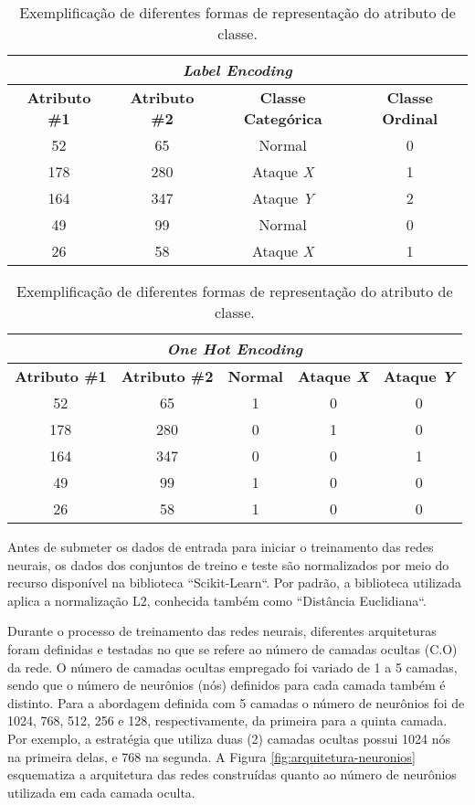 \begin{table}[H]
    \centering
    \begin{tabular}{cccc}
        \multicolumn{4}{c}{\textit{Label Encoding}} \\
        \hline
        \textbf{Atributo \#1} & \textbf{Atributo \#2} & \textbf{Classe Categórica} & \textbf{Classe Ordinal} \\
        \hline
        52 & 65 & Normal & 0 \\
        178 & 280 & Ataque \textit{X} & 1 \\
        164 & 347 & Ataque \textit{Y} & 2 \\
        49 & 99 & Normal & 0 \\
        26 & 58 & Ataque \textit{X} & 1 \\
        \hline
    \end{tabular}
    \begin{tabular}{ccccc}
        \\
        \multicolumn{5}{c}{\textit{One Hot Encoding}} \\
        \hline
        \textbf{Atributo \#1} & \textbf{Atributo \#2} & \textbf{Normal} & \textbf{Ataque \textit{X}} & \textbf{Ataque \textit{Y}} \\
        \hline
        52 & 65 & 1 & 0 & 0\\
        178 & 280 & 0 & 1 & 0 \\
        164 & 347 & 0 & 0 & 1 \\
        49 & 99 & 1 & 0 & 0\\
        26 & 58 & 1 & 0 & 0\\
        \hline
    \end{tabular}
    \caption{Exemplificação de diferentes formas de representação do atributo de classe.}
    \label{tab:encoding}
\end{table}


Antes de submeter os dados de entrada para iniciar o treinamento das redes neurais, os dados dos conjuntos de treino e teste são normalizados por meio do recurso disponível na biblioteca ``Scikit-Learn``. Por padrão, a biblioteca utilizada aplica a normalização L2, conhecida também como ``Distância Euclidiana``.

Durante o processo de treinamento das redes neurais, diferentes arquiteturas foram definidas e testadas no que se refere ao número de camadas ocultas (C.O) da rede. O número de camadas ocultas empregado foi variado de 1 a 5 camadas, sendo que o número de neurônios (nós) definidos para cada camada também é distinto. Para a abordagem definida com 5 camadas o número de neurônios foi de 1024, 768, 512, 256 e 128, respectivamente, da primeira para a quinta camada. Por exemplo, a estratégia que utiliza duas (2) camadas ocultas possui 1024 nós na primeira delas, e 768 na segunda. A Figura \ref{fig:arquitetura-neuronios} esquematiza a arquitetura das redes construídas quanto ao número de neurônios utilizada em cada camada oculta.

